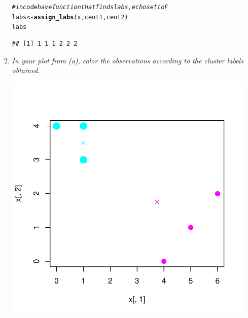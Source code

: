 \documentclass[11pt]{article}\usepackage[]{graphicx}\usepackage[]{color}
\makeatletter
\def\maxwidth{ %
  \ifdim\Gin@nat@width>\linewidth
    \linewidth
  \else
    \Gin@nat@width
  \fi
}
\newcommand{\hlcom}[1]{\textcolor[rgb]{0.678,0.584,0.686}{\textit{#1}}}%
\newcommand{\hlstd}[1]{\textcolor[rgb]{0.345,0.345,0.345}{#1}}%
\newcommand{\hlkwb}[1]{\textcolor[rgb]{0.69,0.353,0.396}{#1}}%
\newcommand{\hlkwd}[1]{\textcolor[rgb]{0.737,0.353,0.396}{\textbf{#1}}}%
\newenvironment{kframe}{%
 \def\at@end@of@kframe{}%
 \ifinner\ifhmode%
  \def\at@end@of@kframe{\end{minipage}}%
  \begin{minipage}{\columnwidth}%
 \fi\fi%
 \def\FrameCommand##1{\hskip\@totalleftmargin \hskip-\fboxsep
 \colorbox{shadecolor}{##1}\hskip-\fboxsep
     \hskip-\linewidth \hskip-\@totalleftmargin \hskip\columnwidth}%
 \MakeFramed {\advance\hsize-\width
   \@totalleftmargin\z@ \linewidth\hsize
   \@setminipage}}%
 {\par\unskip\endMakeFramed%
 \at@end@of@kframe}
\newenvironment{knitrout}{}{} %
\makeatother
\begin{document}
\begin{enumerate}
\begin{enumerate}
\begin{knitrout}
\color{fgcolor}\begin{kframe}
\begin{alltt}
\hlcom{# in code have function that finds labs, echo set to F}
\hlstd{labs} \hlkwb{<-} \hlkwd{assign_labs}\hlstd{(x, cent1, cent2)}
\hlstd{labs}
\end{alltt}
\begin{verbatim}
## [1] 1 1 1 2 2 2
\end{verbatim}
\end{kframe}
\end{knitrout}
				
				\item \textit{In your plot from (a), color the observations according to the cluster labels obtained.}

\begin{knitrout}
\color{fgcolor}

{\centering \includegraphics[width=\maxwidth]{figure/unnamed-chunk-7-1} 

}



\end{knitrout}

            
            \end{enumerate}




\end{enumerate}
\end{document}
